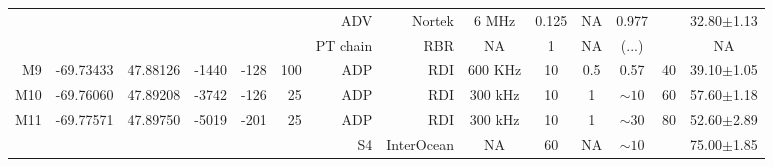 \documentclass[letterpaper,10pt,landscape]{article}
\begin{document}
\begin{table}
\begin{tabular}{|r|c|c|r|r|r|r|r|c|c|c|c|c|c|}
    ~                   &                            &                           &                        &                      &                     & ADV          & Nortek     & 6 MHz     & 0.125     & NA       & 0.977      &                    &  32.80$\pm$1.13   \\ %
    ~                   &                            &                           &                        &                      &                     & PT chain     & RBR        & NA        & 1         & NA       & (...)      &                    &  NA               \\\hline
    M9                  & -69.73433                  & 47.88126                  & -1440                  & -128                 & 100                 & ADP          & RDI        & 600 KHz   & 10        & 0.5      & 0.57       & 40                 &  39.10$\pm$1.05   \\\hline
    M10                 & -69.76060                  & 47.89208                  & -3742                  & -126                 & 25                  & ADP          & RDI        & 300 kHz   & 10        & 1        & $\sim10$   & 60                 &  57.60$\pm$1.18   \\\hline
    \multirow{2}{*}{M11}& \multirow{2}{*}{-69.77571} & \multirow{2}{*}{47.89750} & \multirow{2}{*}{-5019} & \multirow{2}{*}{-201}& \multirow{2}{*}{25} & ADP          & RDI        & 300 kHz   & 10        & 1        & $\sim30$   & \multirow{2}{*}{80}&  52.60$\pm$2.89   \\
    ~                   &                            &                           &                        &                      &                     & S4           & InterOcean & NA        & 60        & NA       & $\sim10$   &                    &  75.00$\pm$1.85   \\\hline
 \end{tabular}


\end{table}
\end{document}
